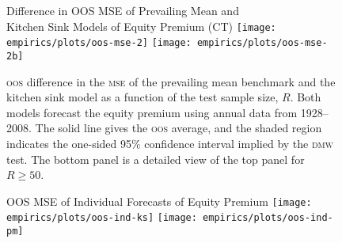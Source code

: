 \documentclass[11pt]{article}
\begin{document}
\begin{figure}
\centering
\large{Difference in OOS MSE of Prevailing Mean and\\ Kitchen
    Sink Models of Equity Premium (CT)}
\texttt{[image: empirics/plots/oos-mse-2]}
\texttt{[image: empirics/plots/oos-mse-2b]}
\caption{\protect \textsc{oos} difference in the \protect\textsc{mse}
  of the prevailing mean benchmark and the kitchen sink model as a
  function of the test sample size, $R$.  Both models forecast the
  equity premium using annual data from 1928--2008.  The solid line
  gives the \protect \textsc{oos} average, and the shaded region indicates the
  one-sided 95\% confidence interval implied by the \protect
  \textsc{dmw} test.  The bottom panel is a detailed view of the top
  panel for $R \geq 50$.}
\label{fig:empirics2}
\end{figure}

\begin{figure}
\centering
\large{OOS MSE of Individual Forecasts of Equity Premium}
\texttt{[image: empirics/plots/oos-ind-ks]}
\texttt{[image: empirics/plots/oos-ind-pm]}
\caption{}
\label{fig:empirics3}
\end{figure}
\end{document}
